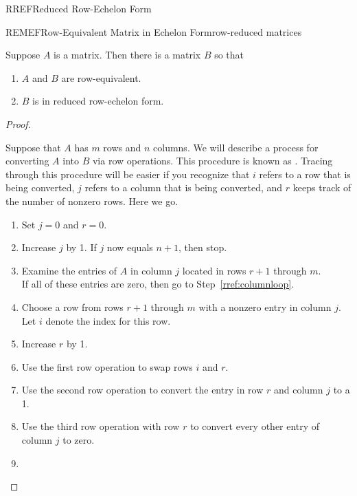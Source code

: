 \begin{subsect}{RREF}{Reduced Row-Echelon Form}
%
\begin{theorem}{REMEF}{Row-Equivalent Matrix in Echelon Form}{row-reduced matrices}
\begin{para}Suppose $A$ is a matrix.  Then there is a matrix $B$ so that
\begin{enumerate}
\item $A$ and $B$ are row-equivalent.
\item $B$ is in reduced row-echelon form.
\end{enumerate}\end{para}
\end{theorem}
%
\begin{proof}
\begin{para}Suppose that $A$ has $m$ rows and $n$ columns.  We will describe a process for converting $A$ into $B$ via row operations.  This procedure is known as .  Tracing through this procedure will be easier if you recognize that $i$ refers to a row that is being converted, $j$ refers to a column that is being converted, and $r$ keeps track of the number of nonzero rows.  Here we go.\end{para}
%
\begin{para}\begin{enumerate}
%
\item\label{rref:initialize}
Set $j=0$ and $r=0$.
%
\item\label{rref:columnloop}
Increase $j$ by 1.  If $j$ now equals $n+1$, then stop.
%
\item\label{rref:locate}
Examine the entries of $A$ in column $j$ located in rows $r+1$ through $m$.\\
If all of these entries are zero, then go to Step~\ref{rref:columnloop}.
%
\item\label{rref:rowchoice}
Choose a row from rows $r+1$ through $m$ with a nonzero entry in column $j$.\\
Let $i$ denote the index for this row.
%
\item\label{rref:incrementrank}
Increase $r$ by 1.
%
\item\label{rref:swap}
Use the first row operation to swap rows $i$ and $r$.
%
\item\label{rref:normalize}
Use the second row operation to convert the entry in row $r$ and column $j$ to a 1.
%
\item\label{rref:zeroout}
Use the third row operation with row $r$ to convert every other entry of column $j$ to zero.
%
\item\label{rref:columnloopreturn}

\end{enumerate}
\end{para}
\end{proof}
\end{subsect}
